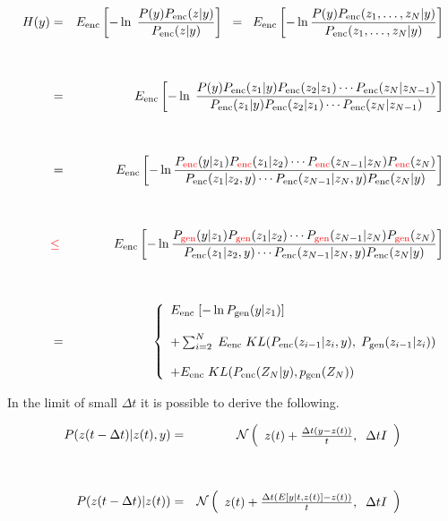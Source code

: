 {{\Large
\begin{eqnarray*}
H(y) & = & E_{\mathrm{enc}}\left[-\ln\; \frac{P(y)P_{\mathrm{enc}}(z|y)}{P_{\mathrm{enc}}(z|y)}\right]\;\;=\;\; E_{\mathrm{enc}}\left[- \ln\frac{P(y)P_{\mathrm{enc}}(z_1,\ldots,z_N|y)}{P_{\mathrm{enc}}(z_1,\ldots,z_N|y)}\right]\\
\\
\\
  & = & E_{\mathrm{enc}}\left[ - \ln \;\frac{P(y)P_{\mathrm{enc}}(z_1|y)P_{\mathrm{enc}}(z_2|z_1)\cdots P_{\mathrm{enc}}(z_N|z_{N-1})}
{P_{\mathrm{enc}}(z_1|y)P_{\mathrm{enc}}(z_2|z_1)\cdots P_{\mathrm{enc}}(z_N|z_{N-1})}\right] \\
\\
\\
  & = & E_{\mathrm{enc}}\left[ - \ln\frac{P_{\color{red} \mathrm{enc}}(y|z_1)P_{\color{red} \mathrm{enc}}(z_1|z_2)\cdots P_{\color{red} \mathrm{enc}}(z_{N-1}|z_N)P_{\color{red} \mathrm{enc}}(z_N)}
  {P_{\mathrm{enc}}(z_1|z_2,y)\cdots P_{\mathrm{enc}}(z_{N-1}|z_N,y)P_{\mathrm{enc}}(z_N|y)}\right] \\
\\
\\
  & {\color{red} \leq} & E_{\mathrm{enc}}\left[ - \ln\frac{P_{\color{red} \mathrm{gen}}(y|z_1)P_{\color{red} \mathrm{gen}}(z_1|z_2)\cdots P_{\color{red} \mathrm{gen}}(z_{N-1}|z_N)P_{\color{red} \mathrm{gen}}(z_N)}
  {P_{\mathrm{enc}}(z_1|z_2,y)\cdots P_{\mathrm{enc}}(z_{N-1}|z_N,y)P_{\mathrm{enc}}(z_N|y)}\right] \\
\\
\\
 & = & \left\{\begin{array}{l}E_{\mathrm{enc}}\;[-\ln P_{\mathrm{gen}}(y|z_1)]
                             \\ \\ + \sum_{i=2}^N  \; E_{\mathrm{enc}}\; KL(P_{\mathrm{enc}}(z_{i-1}|z_i,y),\;P_{\mathrm{gen}}(z_{i-1}|z_i)) \\
                             \\ + E_{\mathrm{enc}}\; KL(P_{\mathrm{enc}}(Z_N|y),p_{\mathrm{gen}}(Z_N))\end{array}\right.
\end{eqnarray*}
}


In the limit of small $\Delta t$ it is possible to derive the following.

\begin{eqnarray*}
  P(z(t - \Delta t)|z(t),y) & = & {\cal N}\left(\begin{array}{l}z(t) + \frac{\Delta t(y - z(t))}{t},\;\; \Delta t I\end{array}\right) \\
  \\
  \\
  P(z(t - \Delta t)|z(t)) & = & {\cal N}\left(\begin{array}{l} z(t) + \frac{\Delta t(E[y|t,z(t)] - z(t))}{t}, \;\; \Delta t I\end{array}\right)
\end{eqnarray*}


}

